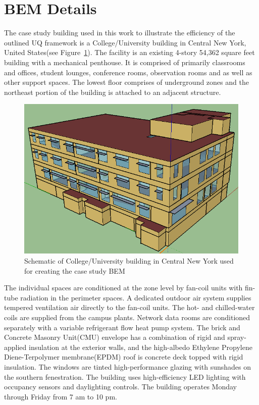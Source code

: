 \section{BEM Details}
\label{case_study}

The case study building used in this work to illustrate the efficiency of the outlined UQ framework is a College/University building in Central New York, United States(see Figure~\ref{building}). The facility is an existing 4-story 54,362 square feet building with a mechanical penthouse.  It is comprised of primarily classrooms and offices, student lounges, conference rooms, observation rooms and as well as other support spaces.  The lowest floor comprises of underground zones and the northeast portion of the building is attached to an adjacent structure.

\begin{figure}[H]
\centering
\includegraphics[scale=0.4]{jbs_figures/building}
\caption{Schematic of College/University building in Central New York used for creating the case study BEM}
\label{building}
\end{figure}

The individual spaces are conditioned at the zone level by fan-coil units with fin-tube radiation in the perimeter spaces.  A dedicated outdoor air system supplies tempered ventilation air directly to the fan-coil units.  The hot- and chilled-water coils are supplied from the campus plants.  Network data rooms are conditioned separately with a variable refrigerant flow heat pump system.  The brick and Concrete Masonry Unit(CMU) envelope has a combination of rigid and spray-applied insulation at the exterior walls, and the high-albedo Ethylene Propylene Diene-Terpolymer membrane(EPDM) roof is concrete deck topped with rigid insulation. The windows are tinted high-performance glazing with sunshades on the southern fenestration. The building uses high-efficiency LED lighting with occupancy sensors and daylighting controls. The building operates Monday through Friday from 7 am to 10 pm.

